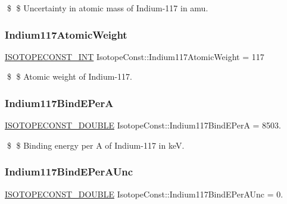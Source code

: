 \$ \$ Uncertainty in atomic mass of Indium-\/117 in amu. \mbox{\label{group___isotope_const-_indium-_in117_ga4fea8f0433831400c743e3977098b74b}} 
\subsubsection{\texorpdfstring{Indium117\+Atomic\+Weight}{Indium117AtomicWeight}}
{\footnotesize\ttfamily \mbox{\hyperlink{group___isotope_const-_macros_ga5f18360b3e99483a35c32d789e62621c}{I\+S\+O\+T\+O\+P\+E\+C\+O\+N\+S\+T\+\_\+\+I\+NT}} Isotope\+Const\+::\+Indium117\+Atomic\+Weight = 117}

\$ \$ Atomic weight of Indium-\/117. \mbox{\label{group___isotope_const-_indium-_in117_ga3f54f10f00935077a8df205575469ed0}} 
\subsubsection{\texorpdfstring{Indium117\+Bind\+E\+PerA}{Indium117BindEPerA}}
{\footnotesize\ttfamily \mbox{\hyperlink{group___isotope_const-_macros_ga8f45a7272ce02c0b4c65c44636ed719a}{I\+S\+O\+T\+O\+P\+E\+C\+O\+N\+S\+T\+\_\+\+D\+O\+U\+B\+LE}} Isotope\+Const\+::\+Indium117\+Bind\+E\+PerA = 8503.}

\$ \$ Binding energy per A of Indium-\/117 in keV. \mbox{\label{group___isotope_const-_indium-_in117_gaf3c4a8a01e39b5090b919fed4399988a}} 
\subsubsection{\texorpdfstring{Indium117\+Bind\+E\+Per\+A\+Unc}{Indium117BindEPerAUnc}}
{\footnotesize\ttfamily \mbox{\hyperlink{group___isotope_const-_macros_ga8f45a7272ce02c0b4c65c44636ed719a}{I\+S\+O\+T\+O\+P\+E\+C\+O\+N\+S\+T\+\_\+\+D\+O\+U\+B\+LE}} Isotope\+Const\+::\+Indium117\+Bind\+E\+Per\+A\+Unc = 0.}


